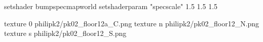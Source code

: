 setshader bumpspecmapworld
setshaderparam "specscale" 1.5 1.5 1.5

texture 0 philipk2/pk02_floor12a_C.png
texture n philipk2/pk02_floor12_N.png
texture s philipk2/pk02_floor12_S.png

